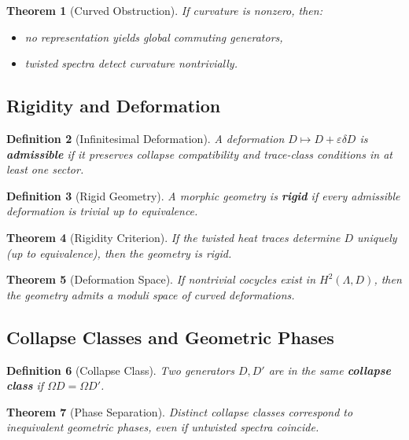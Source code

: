 \documentclass[12pt, oneside]{article}
\newtheorem{theorem}{Theorem}[section]
\newtheorem{definition}[theorem]{Definition}
\begin{document}
\begin{theorem}[Curved Obstruction]
If curvature is nonzero, then:
\begin{itemize}
    \item no representation yields global commuting generators,
    \item twisted spectra detect curvature nontrivially.
\end{itemize}
\end{theorem}

\subsection{Rigidity and Deformation}

\begin{definition}[Infinitesimal Deformation]
A deformation $D \mapsto D + \varepsilon \delta D$ is \textbf{admissible} if it preserves collapse compatibility and trace-class conditions in at least one sector.
\end{definition}

\begin{definition}[Rigid Geometry]
A morphic geometry is \textbf{rigid} if every admissible deformation is trivial up to equivalence.
\end{definition}

\begin{theorem}[Rigidity Criterion]
If the twisted heat traces determine $D$ uniquely (up to equivalence), then the geometry is rigid.
\end{theorem}

\begin{theorem}[Deformation Space]
If nontrivial cocycles exist in $H^2(\Lambda, D)$, then the geometry admits a moduli space of curved deformations.
\end{theorem}

\subsection{Collapse Classes and Geometric Phases}

\begin{definition}[Collapse Class]
Two generators $D, D'$ are in the same \textbf{collapse class} if $\Omega D = \Omega D'$.
\end{definition}

\begin{theorem}[Phase Separation]
Distinct collapse classes correspond to inequivalent geometric phases, even if untwisted spectra coincide.
\end{theorem}
\end{document}
